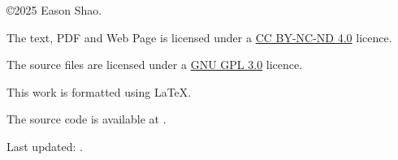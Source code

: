 \noindent \copyright 2025 Eason Shao.

\noindent The text, PDF and Web Page is licensed under a \href{https://creativecommons.org/licenses/by-nc-nd/4.0/}{CC BY-NC-ND 4.0} licence.

\noindent The source files are licensed under a \href{https://www.gnu.org/licenses/gpl-3.0.en.html#license-text}{GNU GPL 3.0} licence.

\noindent This work is formatted using \LaTeX.

\noindent The source code is available at .

\noindent Last updated: \Date.